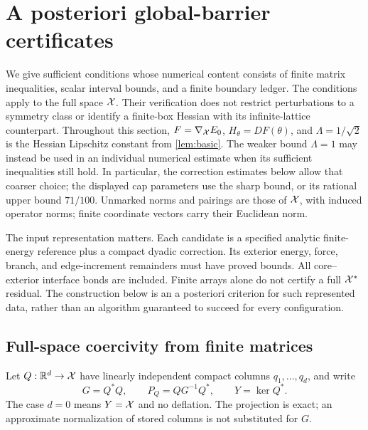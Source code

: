 \section{A posteriori global-barrier certificates}\label{sec:certificate}

We give sufficient conditions whose numerical content consists of finite
matrix inequalities, scalar interval bounds, and a finite boundary ledger.
The conditions apply to the full space $\mathcal X$. Their verification does not
restrict perturbations to a symmetry class or identify a finite-box
Hessian with its infinite-lattice counterpart. Throughout this section,
$F=\nabla_\mathcal XE_0$, $H_\theta=DF(\theta)$, and
$\Lambda=1/\sqrt2$ is the Hessian Lipschitz constant from
\cref{lem:basic}. The weaker bound $\Lambda=1$ may instead be used
in an individual numerical estimate when its sufficient inequalities still
hold. In particular, the correction estimates below allow that coarser
choice; the displayed cap parameters use the sharp bound, or its rational
upper bound $71/100$.
Unmarked norms and pairings are those of $\mathcal X$, with induced operator
norms; finite coordinate vectors carry their Euclidean norm.

The input representation matters. Each candidate is a specified analytic
finite-energy reference plus a compact dyadic correction. Its exterior
energy, force, branch, and edge-increment remainders must have proved
bounds. All core--exterior interface bonds are included. Finite arrays
alone do not certify a full $\mathcal X^*$ residual. The construction below is an
a posteriori criterion for such represented data, rather than an
algorithm guaranteed to succeed for every configuration.

\subsection{Full-space coercivity from finite matrices}

Let $Q:\mathbb R^d\to\mathcal X$ have linearly independent compact columns
$q_1,\ldots,q_d$, and write
\begin{equation}\label{eq:cert-projections}
 G=Q^*Q,\qquad P_Q=QG^{-1}Q^*,\qquad Y=\ker Q^*.
\end{equation}
The case $d=0$ means $Y=\mathcal X$ and no deflation. The projection is exact;
an approximate normalization of stored columns is not substituted for $G$.

